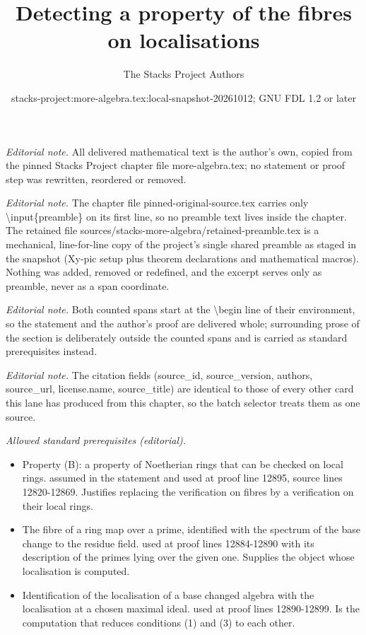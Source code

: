 \documentclass[10pt,a4paper]{amsart}
\title{Detecting a property of the fibres on localisations}
\author{The Stacks Project Authors}
\date{stacks-project:more-algebra.tex:local-snapshot-20261012; GNU FDL 1.2 or later}
\theoremstyle{plain}
\theoremstyle{definition}
\theoremstyle{remark}
\numberwithin{equation}{subsection}
\begin{document}
\maketitle
\setcounter{subsection}{1}
\noindent\textit{Editorial note.} All delivered mathematical text is the author's own, copied from the pinned Stacks Project chapter file more-algebra.tex; no statement or proof step was rewritten, reordered or removed.\par\medskip
\noindent\textit{Editorial note.} The chapter file pinned-original-source.tex carries only \textbackslash{}input\{preamble\} on its first line, so no preamble text lives inside the chapter. The retained file sources/stacks-more-algebra/retained-preamble.tex is a mechanical, line-for-line copy of the project's single shared preamble as staged in the snapshot (Xy-pic setup plus theorem declarations and mathematical macros). Nothing was added, removed or redefined, and the excerpt serves only as preamble, never as a span coordinate.\par\medskip
\noindent\textit{Editorial note.} Both counted spans start at the \textbackslash{}begin line of their environment, so the statement and the author's proof are delivered whole; surrounding prose of the section is deliberately outside the counted spans and is carried as standard prerequisites instead.\par\medskip
\noindent\textit{Editorial note.} The citation fields (source\_id, source\_version, authors, source\_url, license.name, source\_title) are identical to those of every other card this lane has produced from this chapter, so the batch selector treats them as one source.\par\medskip
\noindent\textit{Allowed standard prerequisites (editorial).}\begin{itemize}
\item Property (B): a property of Noetherian rings that can be checked on local rings. assumed in the statement and used at proof line 12895, source lines 12820-12869. Justifies replacing the verification on fibres by a verification on their local rings.
\item The fibre of a ring map over a prime, identified with the spectrum of the base change to the residue field. used at proof lines 12884-12890 with its description of the primes lying over the given one. Supplies the object whose localisation is computed.
\item Identification of the localisation of a base changed algebra with the localisation at a chosen maximal ideal. used at proof lines 12890-12899. Is the computation that reduces conditions (1) and (3) to each other.
\end{itemize}\medskip
\end{document}
